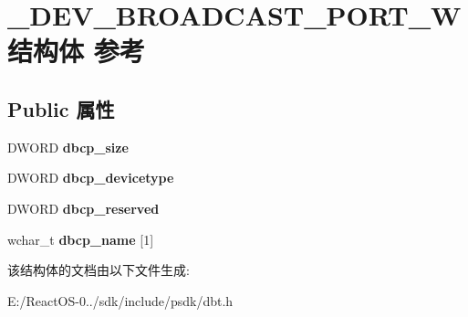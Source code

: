 \hypertarget{struct___d_e_v___b_r_o_a_d_c_a_s_t___p_o_r_t___w}{}\section{\+\_\+\+D\+E\+V\+\_\+\+B\+R\+O\+A\+D\+C\+A\+S\+T\+\_\+\+P\+O\+R\+T\+\_\+\+W结构体 参考}
\label{struct___d_e_v___b_r_o_a_d_c_a_s_t___p_o_r_t___w}
\subsection*{Public 属性}
\begin{DoxyCompactItemize}
\item 
\mbox{\label{struct___d_e_v___b_r_o_a_d_c_a_s_t___p_o_r_t___w_af36d3c4184c32d2b1e53b0af6b48768e}} 
D\+W\+O\+RD {\bfseries dbcp\+\_\+size}
\item 
\mbox{\label{struct___d_e_v___b_r_o_a_d_c_a_s_t___p_o_r_t___w_a527c88740a38471c507db3452451fc0f}} 
D\+W\+O\+RD {\bfseries dbcp\+\_\+devicetype}
\item 
\mbox{\label{struct___d_e_v___b_r_o_a_d_c_a_s_t___p_o_r_t___w_ab03f2f6aebd90e8b6929cc310f00ef18}} 
D\+W\+O\+RD {\bfseries dbcp\+\_\+reserved}
\item 
\mbox{\label{struct___d_e_v___b_r_o_a_d_c_a_s_t___p_o_r_t___w_abe511ad0e0333e404c7277da1ca3157e}} 
wchar\+\_\+t {\bfseries dbcp\+\_\+name} \mbox{[}1\mbox{]}
\end{DoxyCompactItemize}


该结构体的文档由以下文件生成\+:\begin{DoxyCompactItemize}
\item 
E\+:/\+React\+O\+S-\/0../sdk/include/psdk/dbt.\+h\end{DoxyCompactItemize}
